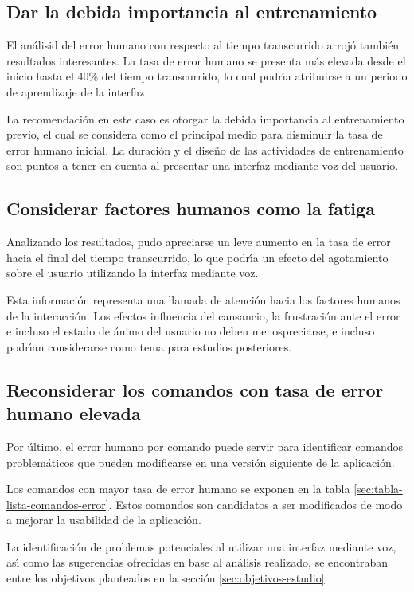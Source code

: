 \subsection{Dar la debida importancia al entrenamiento}
El an\'alisid del error humano con respecto al tiempo transcurrido arroj\'o tambi\'en
resultados interesantes. La tasa de error humano se presenta m\'as elevada desde el inicio hasta
el 40\% del tiempo transcurrido, lo cual podr{{\'\i}}a atribuirse a un periodo de aprendizaje
de la interfaz.

La recomendaci\'on en este caso es otorgar la debida importancia al entrenamiento previo,
el cual se considera como el principal medio para disminuir la tasa de error humano inicial.
La duraci\'on y el dise\~no de las actividades de entrenamiento son puntos a tener en cuenta
al presentar una interfaz mediante voz del usuario.

\subsection{Considerar factores humanos como la fatiga}
Analizando los resultados, pudo apreciarse un leve aumento en la tasa de error hacia el final del tiempo
transcurrido, lo que podr{{\'\i}}a un efecto del agotamiento sobre el usuario utilizando la
interfaz mediante voz.

Esta informaci\'on representa una llamada de atenci\'on hacia los factores humanos de la interacci\'on.
Los efectos influencia del cansancio, la frustraci\'on ante el error e incluso el estado de \'animo
del usuario no deben menospreciarse, e incluso podr{\'\i}an considerarse como tema para estudios
posteriores.

\subsection{Reconsiderar los comandos con tasa de error humano elevada}
Por \'ultimo, el error humano por comando puede servir para identificar comandos 
problem\'aticos que pueden modificarse en una versi\'on siguiente de la aplicaci\'on.

Los comandos con mayor tasa de error humano se exponen en la tabla \ref{sec:tabla-lista-comandos-error}.
Estos comandos son candidatos a ser modificados de modo a mejorar la usabilidad de la
aplicaci\'on.

La identificaci\'on de problemas potenciales al utilizar una interfaz mediante voz, as{\'\i} como las sugerencias
ofrecidas en base al an\'alisis realizado, se encontraban entre los objetivos planteados en la secci\'on 
\ref{sec:objetivos-estudio}.


